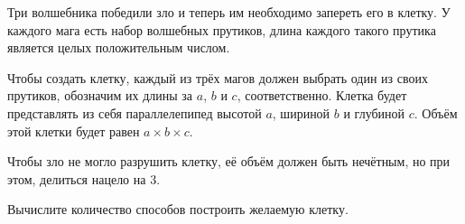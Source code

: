 Три волшебника победили зло и теперь им необходимо запереть его в клетку. У каждого мага есть набор волшебных прутиков, длина каждого такого прутика является целых положительным числом.

Чтобы создать клетку, каждый из трёх магов должен выбрать один из своих прутиков, обозначим их длины за $a$, $b$ и $c$, соответственно. Клетка будет представлять из себя параллелепипед высотой $a$, шириной $b$ и глубиной $c$. Объём этой клетки будет равен $a \times b \times c$.

Чтобы зло не могло разрушить клетку, её объём должен быть нечётным, но при этом, делиться нацело на 3.

Вычислите количество способов построить желаемую клетку.